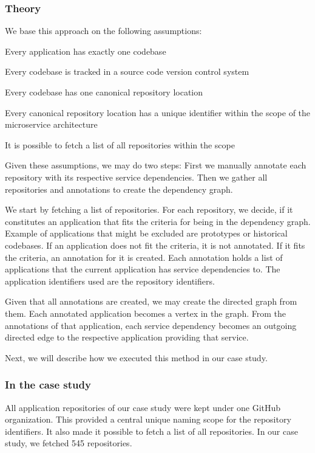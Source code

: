 \subsubsection{Theory}

We base this approach on the following assumptions:

\begin{tenumerate}
  \item Every application has exactly one codebase
  \item Every codebase is tracked in a source code version control system
  \item Every codebase has one canonical repository location
  \item Every canonical repository location has a unique identifier within the scope of the microservice architecture
  \item It is possible to fetch a list of all repositories within the scope
\end{tenumerate}

Given these assumptions, we may do two steps: First we manually annotate each repository with its respective service dependencies. Then we gather all repositories and annotations to create the dependency graph.

We start by fetching a list of repositories. For each repository, we decide, if it constitutes an application that fits the criteria for being in the dependency graph. Example of applications that might be excluded are prototypes or historical codebases. If an application does not fit the criteria, it is not annotated. If it fits the criteria, an annotation for it is created. Each annotation holds a list of applications that the current application has service dependencies to. The application identifiers used are the repository identifiers.

Given that all annotations are created, we may create the directed graph from them. Each annotated application becomes a vertex in the graph. From the annotations of that application, each service dependency becomes an outgoing directed edge to the respective application providing that service.

Next, we will describe how we executed this method in our case study.

\subsubsection{In the case study}

All application repositories of our case study were kept under one GitHub organization. This provided a central unique naming scope for the repository identifiers. It also made it possible to fetch a list of all repositories. In our case study, we fetched 545 repositories.

